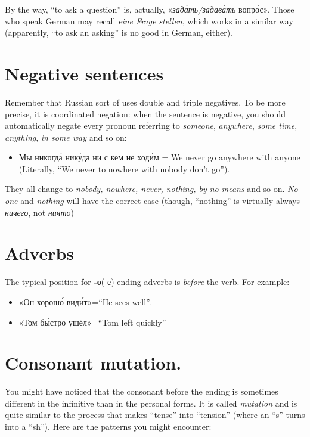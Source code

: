 By the way, ``to ask a question'' is, actually, «\emph{зад\'{а}ть/задав\'{а}ть}
вопр\'{о}с». Those who speak German may recall \emph{eine Frage stellen},
which works in a similar way (apparently, ``to ask an asking'' is no
good in German, either).

\section{Negative sentences}\label{negative-sentences}

Remember that Russian sort of uses double and triple negatives. To be
more precise, it is coordinated negation: when the sentence is negative,
you should automatically negate every pronoun referring to
\emph{someone}, \emph{anywhere}, \emph{some time}, \emph{anything},
\emph{in some way} and so on:

\begin{itemize}
\tightlist
\item
  Мы никогд\'{а} ник\'{у}да ни с кем не ход\'{и}м = We never go anywhere with anyone
  (Literally, ``We never to nowhere with nobody don't go'').
\end{itemize}

They all change to \emph{nobody, nowhere, never, nothing, by no means}
and so on. \emph{No one} and \emph{nothing} will have the correct case
(though, ``nothing'' is virtually always \emph{ничего}, not
\emph{ничто})

\section{Adverbs}\label{adverbs}

The typical position for \textbf{-о}(-е)-ending adverbs is \emph{before}
the verb. For example:

\begin{itemize}
\tightlist
\item
  «Он хорош\'{о} вид\'{и}т»=``He sees well''.
\item
  «Том б\'{ы}стро ушёл»=``Tom left quickly''
\end{itemize}

\section{Consonant mutation.}\label{consonant-mutation.}

You might have noticed that the consonant before the ending is sometimes
different in the infinitive than in the personal forms. It is called
\emph{mutation} and is quite similar to the process that makes ``tense''
into ``tension'' (where an ``s'' turns into a ``sh''). Here are the
patterns you might encounter:

